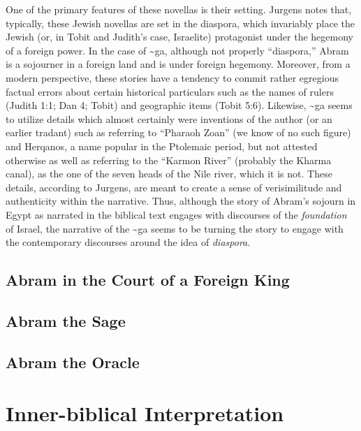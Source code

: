 One of the primary features of these novellas is their setting. Jurgens
notes that, typically, these Jewish novellas are set in the diaspora,
which invariably place the Jewish (or, in Tobit and Judith's case,
Israelite) protagonist under the hegemony of a foreign power. In the
case of \textasciitilde{}ga, although not properly ``diaspora,'' Abram
is a sojourner in a foreign land and is under foreign hegemony.
Moreover, from a modern perspective, these stories have a tendency to
commit rather egregious factual errors about certain historical
particulars such as the names of rulers (Judith 1:1; Dan 4; Tobit) and
geographic items (Tobit 5:6). Likewise, \textasciitilde{}ga seems to
utilize details which almost certainly were inventions of the author (or
an earlier tradant) such as referring to ``Pharaoh Zoan'' (we know of no
such figure) and Herqanos, a name popular in the Ptolemaic period, but
not attested otherwise as well as referring to the ``Karmon River''
(probably the Kharma canal), as the one of the seven heads of the Nile
river, which it is not.\autocites[7]{jurgens_jsj2018}[See
also][50--59]{machiela_as2010}[197--199]{fitzmyer2004} These details,
according to Jurgens, are meant to create a sense of verisimilitude and
authenticity within the narrative. Thus, although the story of Abram's
sojourn in Egypt as narrated in the biblical text engages with
discourses of the \emph{foundation} of Israel, the narrative of the
\textasciitilde{}ga seems to be turning the story to engage with the
contemporary discourses around the idea of \emph{diaspora}.

\hypertarget{abram-in-the-court-of-a-foreign-king}{%
\subsection{Abram in the Court of a Foreign
King}\label{abram-in-the-court-of-a-foreign-king}}

\hypertarget{abram-the-sage}{%
\subsection{Abram the Sage}\label{abram-the-sage}}

\hypertarget{abram-the-oracle}{%
\subsection{Abram the Oracle}\label{abram-the-oracle}}

\hypertarget{inner-biblical-interpretation}{%
\section{Inner-biblical
Interpretation}\label{inner-biblical-interpretation}}
